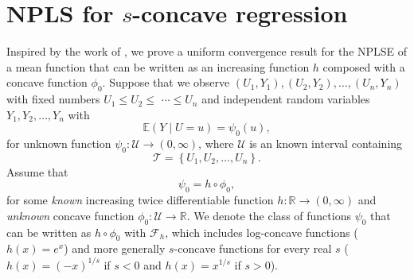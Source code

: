 \documentclass{article} %
\begin{document}


\newpage

\section{NPLS for \ensuremath{s}-concave regression}\label{app:NPLS}
Inspired by the work of \cite{dumbgen2004consistency}, we prove a uniform convergence result for the NPLSE of a mean function that can be written as an increasing function $h$ composed with a concave function $\phi_0$. Suppose that we observe $\left(U_1, Y_1\right),\left(U_2, Y_2\right), \ldots,\left(U_n, Y_n\right)$ with fixed numbers $U_1 \leq U_2 \leq$ $\cdots \leq U_n$ and independent random variables $Y_1, Y_2, \ldots, Y_n $ with 
$$
\mathbb{E}\left(Y \mid U=u\right)=\psi_0\left(u\right),
$$
for unknown function $\psi_0:\mathcal{U} \rightarrow (0,\infty)$, where $\mathcal{U}$ is an known interval containing 
$$
\mathscr{T} = \left\{U_1, U_2, \ldots, U_n\right\}.
$$
Assume that
\begin{equation}\label{eq:F_0=v_lambda}
    \psi_0 = h \circ \phi_0 ,
\end{equation}  
for some \textit{known} increasing twice differentiable function $h: \mathbb{R}\rightarrow (0,\infty)$ and \textit{unknown} concave function $\phi_0:\mathcal{U}\rightarrow \mathbb{R}$. We denote the class of functions $\psi_0$ that can be written as $h \circ \phi_0$ with $\mathcal{F}_h$, which includes log-concave functions ($h(x) = e^x$) and more generally $s$-concave functions for every real $s$ ($h(x) = (-x)^{1/s}$ if $s<0$ and $h(x) = x^{1/s}$ if $s>0$).
\end{document}
